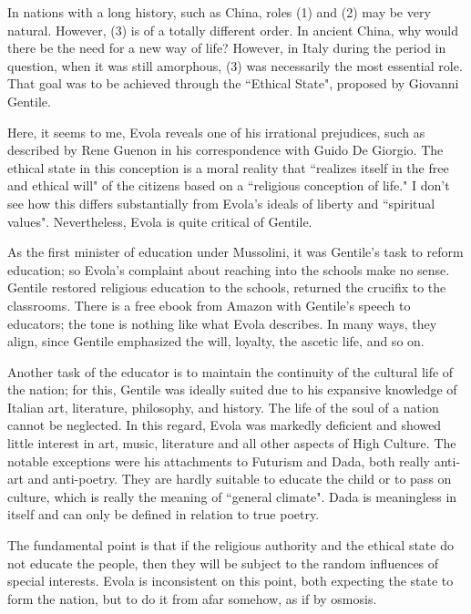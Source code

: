In nations with a long history, such as China, roles (1) and (2) may be very natural. However, (3) is of a totally different order. In ancient China, why would there be the need for a new way of life? However, in Italy during the period in question, when it was still amorphous, (3) was necessarily the most essential role. That goal was to be achieved through the ``Ethical State", proposed by Giovanni Gentile.

Here, it seems to me, Evola reveals one of his irrational prejudices, such as described by Rene Guenon in his correspondence with Guido De Giorgio. The ethical state in this conception is a moral reality that ``realizes itself in the free and ethical will" of the citizens based on a ``religious conception of life." I don't see how this differs substantially from Evola's ideals of liberty and ``spiritual values". Nevertheless, Evola is quite critical of Gentile.

As the first minister of education under Mussolini, it was Gentile's task to reform education; so Evola's complaint about reaching into the schools make no sense. Gentile restored religious education to the schools, returned the crucifix to the classrooms. There is a free ebook from Amazon with Gentile's speech to educators; the tone is nothing like what Evola describes. In many ways, they align, since Gentile emphasized the will, loyalty, the ascetic life, and so on.

Another task of the educator is to maintain the continuity of the cultural life of the nation; for this, Gentile was ideally suited due to his expansive knowledge of Italian art, literature, philosophy, and history. The life of the soul of a nation cannot be neglected. In this regard, Evola was markedly deficient and showed little interest in art, music, literature and all other aspects of High Culture. The notable exceptions were his attachments to Futurism and Dada, both really anti-art and anti-poetry. They are hardly suitable to educate the child or to pass on culture, which is really the meaning of ``general climate". Dada is meaningless in itself and can only be defined in relation to true poetry.

The fundamental point is that if the religious authority and the ethical state do not educate the people, then they will be subject to the random influences of special interests. Evola is inconsistent on this point, both expecting the state to form the nation, but to do it from afar somehow, as if by osmosis.

